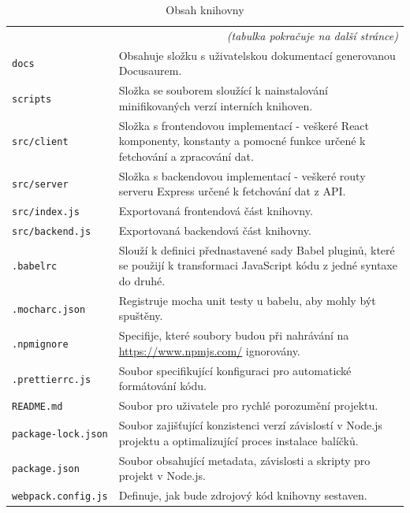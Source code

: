 \documentclass[czech, bc, kiv, he, iso690numb]{fasthesis}
\begin{document}
\begin{center}
	\begin{longtable}{p{}p{}}
	\caption{Obsah knihovny}
	\label{tab:dirLibrary}\\
	\toprule[1.5pt]
	\endhead
	\midrule
	\multicolumn{2}{r}{\textit{(tabulka pokračuje na další stránce)}}\\
	\endfoot
	\bottomrule[1.5pt]
	\endlastfoot
	\verb"docs" & Obsahuje složku s uživatelskou dokumentací generovanou Docusaurem. \\
	\midrule
	\verb"scripts" & Složka se souborem sloužící k nainstalování minifikovaných verzí interních knihoven. \\
	\midrule
	\verb"src/client" & Složka s frontendovou implementací - veškeré React komponenty, konstanty a pomocné funkce určené k fetchování a zpracování dat.  \\
	\midrule
	\verb"src/server" & Složka s backendovou implementací - veškeré routy serveru Express určené k fetchování dat z API.  \\
	\midrule
	\verb"src/index.js" & Exportovaná frontendová část knihovny. \\
	\midrule
	\verb"src/backend.js" & Exportovaná backendová část knihovny. \\
	\midrule
	\verb".babelrc" & Slouží k definici přednastavené sady Babel pluginů, které se použijí k transformaci JavaScript kódu z jedné syntaxe do druhé.  \\
	\midrule
	\verb".mocharc.json" & Registruje mocha unit testy u babelu, aby mohly být spuštěny.  \\
	\midrule
	\verb".npmignore" & Specifije, které soubory budou při nahrávání na \url{https://www.npmjs.com/} ignorovány. \\
	\midrule
	\verb".prettierrc.js" & Soubor specifikující konfiguraci pro automatické formátování kódu. \\
	\midrule
	\verb"README.md" & Soubor pro uživatele pro rychlé porozumění projektu.  \\
	\midrule
	\verb"package-lock.json" & Soubor zajišťující konzistenci verzí závislostí v Node.js projektu a optimalizující proces instalace balíčků.  \\
	\midrule
	\verb"package.json" & Soubor obsahující metadata, závislosti a skripty pro projekt v Node.js. \\
	\midrule
	\verb"webpack.config.js" & Definuje, jak bude zdrojový kód knihovny sestaven.  \\
	\end{longtable}
\end{center}
\end{document}
